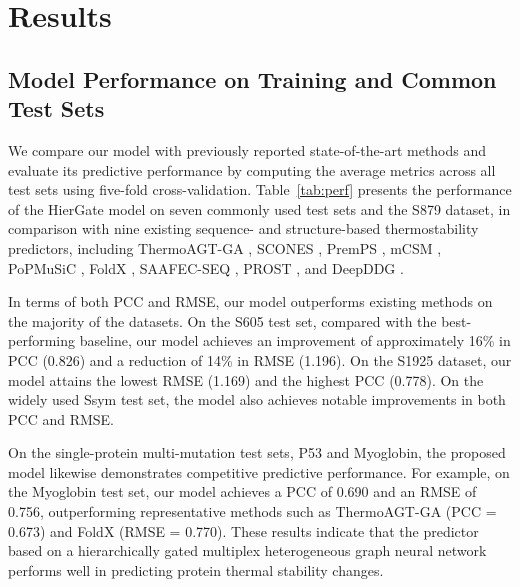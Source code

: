 \documentclass[journal,twoside,web]{ieeecolor}
\begin{document}
\section{Results}
\label{sec:results}

\subsection{Model Performance on Training and Common Test Sets}
\label{subsec:perf}

We compare our model with previously reported state-of-the-art methods and evaluate its predictive performance by computing the average metrics across all test sets using five-fold cross-validation. Table~\ref{tab:perf} presents the performance of the HierGate model on seven commonly used test sets and the S879 dataset, in comparison with nine existing sequence- and structure-based thermostability predictors, including ThermoAGT-GA \cite{Madani2024_a}, SCONES \cite{Samaga2021}, PremPS \cite{Chen2020_a}, mCSM \cite{Pires2014_a}, PoPMuSiC \cite{Dehouck2011_a}, FoldX \cite{Guerois2002_a}, SAAFEC-SEQ \cite{Li2021}, PROST \cite{Iqbal2022}, and DeepDDG \cite{Cao2019}.

In terms of both PCC and RMSE, our model outperforms existing methods on the majority of the datasets. On the S605 test set, compared with the best-performing baseline, our model achieves an improvement of approximately 16\% in PCC (0.826) and a reduction of 14\% in RMSE (1.196). On the S1925 dataset, our model attains the lowest RMSE (1.169) and the highest PCC (0.778). On the widely used Ssym test set, the model also achieves notable improvements in both PCC and RMSE.

On the single-protein multi-mutation test sets, P53 and Myoglobin, the proposed model likewise demonstrates competitive predictive performance. For example, on the Myoglobin test set, our model achieves a PCC of 0.690 and an RMSE of 0.756, outperforming representative methods such as ThermoAGT-GA (PCC = 0.673) and FoldX (RMSE = 0.770). These results indicate that the predictor based on a hierarchically gated multiplex heterogeneous graph neural network performs well in predicting protein thermal stability changes.
\end{document}
